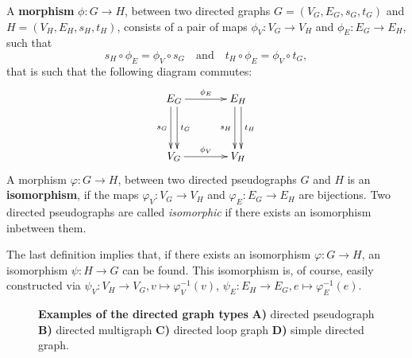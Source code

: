 
A \textbf{morphism} $\phi: G \to H$, between two directed graphs $G=(
V_G, E_G, \allowbreak s_G, \allowbreak t_G)$ and
$H=(V_H,E_H,s_H,t_H)$, consists of a pair of maps $\phi_V: V_G \to
V_H$ and $\phi_E: E_G \to E_H$, such that
\[
s_H \circ \phi_E = \phi_V \circ s_G \mathrm{\quad and \quad} t_H \circ
\phi_E = \phi_V \circ t_G,
\]
that is such that the following diagram commutes:
%
\begin{align*} 
  \xymatrix@+=1.3cm{E_G \ar^{t_G}@<0.66ex>[d] \ar_{s_G}@<-0.66ex>[d]
    \ar^{\phi_E}[r] & E_H \ar^{t_H}@<0.66ex>[d]
    \ar_{s_H}@<-0.66ex>[d]\\ V_G \ar^{\phi_V}[r] & V_H}
\end{align*}
%
A morphism $\varphi: G \to H$, between two directed pseudographs $G$
and $H$ is an \textbf{isomorphism}, if the maps $\varphi_V: V_G \to
V_H$ and $\varphi_E: E_G \to E_H$ are bijections. Two directed
pseudographs are called \textit{isomorphic} if there exists an
isomorphism inbetween them.


\begin{remark}
  The last definition implies that, if there exists an isomorphism
  $\varphi: G \to H$, an isomorphism $\psi: H \to G$ can be
  found. This isomorphism is, of course, easily constructed via
  $\psi_V: V_H \to V_G, v \mapsto \varphi_V^{-1}(v)$, $\psi_E: E_H \to
  E_G, e \mapsto \varphi_E^{-1}(e)$.
\end{remark}

\begin{figure}[H]
  \centering 
  \vfill
  \vspace{0.25cm}
    \caption{%
      \textbf{Examples of the directed graph types}
      \textbf{A)} directed pseudograph \textbf{B)} directed
      multigraph \textbf{C)} directed loop graph \textbf{D)} simple
      directed graph.} %
  \label{fig:directed_graph_types}
\end{figure}

